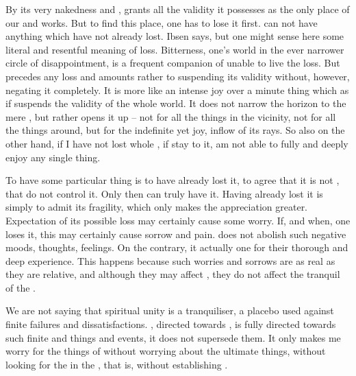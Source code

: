 \pa By its very nakedness and ,  grants
 all the validity it possesses as the only place of our 
and works.  But to find this place, one has to lose it first.   can not
have anything which  have not already lost.  Ibsen says,  but one might sense
here some literal and resentful meaning of loss.  Bitterness,  one's
world in the ever narrower circle of disappointment, is a frequent companion of
 unable to live the  loss.  But 
precedes any  loss and amounts rather to suspending its validity
without, however, negating it completely. It is more like an intense joy over a
minute thing which as if suspends the validity of the whole world. It does not
narrow the horizon to the mere \herenow, but rather opens it up -- not for all
the things in the vicinity, not for all the  things around, but for
the indefinite yet  joy, inflow of its rays.  So also on the other
hand, if I have not lost  whole , if  stay
 to it,  am not able to fully and deeply enjoy any single
thing.

To have some particular thing is to have already lost it, to agree that it
is not , that  do not control it. Only then can  truly have
it.  Having already lost it is simply to admit its
fragility, which only makes the appreciation greater.  Expectation of its
possible loss may certainly cause some worry.  If, and when, one
 loses it, this may certainly cause sorrow and pain.  
does not abolish such negative moods, thoughts, feelings. On the contrary,
it actually  one for their thorough and deep experience. This
happens because such worries and sorrows are as real as they are relative, and
although they may affect , they do not affect the tranquil  of the 
.

We are not saying that spiritual unity is a tranquiliser, a placebo
used against finite failures and  dissatisfactions. ,
directed towards , is fully directed towards such finite and
 things and events, it does not supersede them. It only makes me
worry for the things of  without worrying about the ultimate
things, without looking for the  in the , that is,
without establishing .

